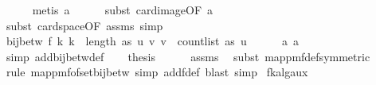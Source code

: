 \begin{isabellebody}
\ \ \ \ \isamarkupfalse%
\ {\isacharparenleft}{\kern0pt}metis\ a{}{\isacharunderscore}{\kern0pt}{}{\isacharparenright}{\kern0pt}\isanewline
\ \ \ \ \isamarkupfalse%
\ {\isacharparenleft}{\kern0pt}subst\ card{\isacharunderscore}{\kern0pt}image{\isacharbrackleft}{\kern0pt}OF\ a{}{\isacharbrackright}{\kern0pt}{\isacharparenright}{\kern0pt}\isanewline
\ \ \ \ \isamarkupfalse%
\ {\isacharparenleft}{\kern0pt}subst\ card{\isacharunderscore}{\kern0pt}space{\isacharbrackleft}{\kern0pt}OF\ assms{\isacharparenleft}{\kern0pt}{}{\isacharparenright}{\kern0pt}{\isacharbrackright}{\kern0pt}{\isacharcomma}{\kern0pt}\ simp{\isacharparenright}{\kern0pt}\isanewline
\isanewline
\ \ \isamarkupfalse%
\ {\isachardoublequoteopen}bij{\isacharunderscore}{\kern0pt}betw\ f\ {\isacharbraceleft}{\kern0pt}k{\isachardot}{\kern0pt}\ k\ {\isacharless}{\kern0pt}\ length\ as{\isacharbraceright}{\kern0pt}\ {\isacharbraceleft}{\kern0pt}{\isacharparenleft}{\kern0pt}u{\isacharcomma}{\kern0pt}\ v{\isacharparenright}{\kern0pt}{\isachardot}{\kern0pt}\ v\ {\isacharless}{\kern0pt}\ count{\isacharunderscore}{\kern0pt}list\ as\ u{\isacharbraceright}{\kern0pt}{\isachardoublequoteclose}\isanewline
\ \ \ \ \isamarkupfalse%
\ a{}\ a{}\ \isamarkupfalse%
\ {\isacharparenleft}{\kern0pt}simp\ add{\isacharcolon}{\kern0pt}bij{\isacharunderscore}{\kern0pt}betw{\isacharunderscore}{\kern0pt}def{\isacharparenright}{\kern0pt}\isanewline
\ \ \isamarkupfalse%
\ {\isacharquery}{\kern0pt}thesis\isanewline
\ \ \ \ \isamarkupfalse%
\ assms\ \isamarkupfalse%
\ {\isacharparenleft}{\kern0pt}subst\ map{\isacharunderscore}{\kern0pt}pmf{\isacharunderscore}{\kern0pt}def{\isacharbrackleft}{\kern0pt}symmetric{\isacharbrackright}{\kern0pt}{\isacharparenright}{\kern0pt}\isanewline
\ \ \ \ \isamarkupfalse%
\ {\isacharparenleft}{\kern0pt}rule\ map{\isacharunderscore}{\kern0pt}pmf{\isacharunderscore}{\kern0pt}of{\isacharunderscore}{\kern0pt}set{\isacharunderscore}{\kern0pt}bij{\isacharunderscore}{\kern0pt}betw{\isacharcomma}{\kern0pt}\ simp\ add{\isacharcolon}{\kern0pt}f{\isacharunderscore}{\kern0pt}def{\isacharcomma}{\kern0pt}\ blast{\isacharcomma}{\kern0pt}\ simp{\isacharparenright}{\kern0pt}\isanewline
{}\isamarkupfalse%
%
\endisatagproof
{\isafoldproof}%
%
\isadelimproof
\isanewline
%
\endisadelimproof
\isanewline
{}\isamarkupfalse%
\ fk{\isacharunderscore}{\kern0pt}alg{\isacharunderscore}{\kern0pt}aux{\isacharunderscore}{\kern0pt}{}{\isacharcolon}{\kern0pt}\isanewline

\end{isabellebody}
